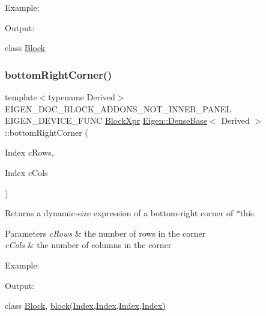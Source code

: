 Example\+: 
\begin{DoxyCodeInclude}{0}
\end{DoxyCodeInclude}
 Output\+: 
\begin{DoxyVerbInclude}
\end{DoxyVerbInclude}
 class \mbox{\hyperlink{class_eigen_1_1_block}{Block}} \mbox{\label{class_eigen_1_1_dense_base_a6cdf27f6b825097f86fc6bcdbeed9e65}} 
\subsubsection{\texorpdfstring{bottomRightCorner()}{bottomRightCorner()}\hspace{0.1cm}{\footnotesize\ttfamily [1/3]}}
{\footnotesize\ttfamily template$<$typename Derived$>$ \\
E\+I\+G\+E\+N\+\_\+\+D\+O\+C\+\_\+\+B\+L\+O\+C\+K\+\_\+\+A\+D\+D\+O\+N\+S\+\_\+\+N\+O\+T\+\_\+\+I\+N\+N\+E\+R\+\_\+\+P\+A\+N\+EL E\+I\+G\+E\+N\+\_\+\+D\+E\+V\+I\+C\+E\+\_\+\+F\+U\+NC \mbox{\hyperlink{class_eigen_1_1_block}{Block\+Xpr}} \mbox{\hyperlink{class_eigen_1_1_dense_base}{Eigen\+::\+Dense\+Base}}$<$ Derived $>$\+::bottom\+Right\+Corner (\begin{DoxyParamCaption}\item[{Index}]{c\+Rows,  }\item[{Index}]{c\+Cols }\end{DoxyParamCaption})\hspace{0.3cm}{\ttfamily [inline]}}

\begin{DoxyReturn}{Returns}
a dynamic-\/size expression of a bottom-\/right corner of $\ast$this.
\end{DoxyReturn}

\begin{DoxyParams}{Parameters}
{\em c\+Rows} & the number of rows in the corner \\
\hline
{\em c\+Cols} & the number of columns in the corner\\
\hline
\end{DoxyParams}
Example\+: 
\begin{DoxyCodeInclude}{0}
\end{DoxyCodeInclude}
 Output\+: 
\begin{DoxyVerbInclude}
\end{DoxyVerbInclude}
 class \mbox{\hyperlink{class_eigen_1_1_block}{Block}}, \mbox{\hyperlink{class_eigen_1_1_dense_base_ab8e42e67c5cfd5fa13e684642f0f65bf}{block(\+Index,\+Index,\+Index,\+Index)}} \mbox{\label{class_eigen_1_1_dense_base_a0ec93fbbf57f19fd6253fe1bef9a960c}} 

